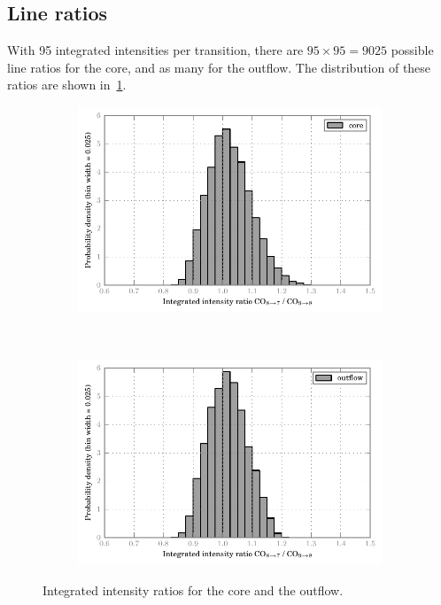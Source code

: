 \subsection{Line ratios}
With 95 integrated intensities per transition, there are $95 \times 95 = 9025$ possible line ratios for the core, and as many for the outflow.
The distribution of these ratios are shown in~\cref{fig:ratio_hist}.
\begin{figure}[hbtp]
    \centering
    \begin{subfigure}[0]{\textwidth}
        \includegraphics{ratio_hist_87_98_core}
    \end{subfigure}
    \\
    \begin{subfigure}[0]{\textwidth}
        \includegraphics{ratio_hist_87_98_outflow}
    \end{subfigure}
    \caption{Integrated intensity ratios for the core and the outflow.}
    \label{fig:ratio_hist}
\end{figure}

